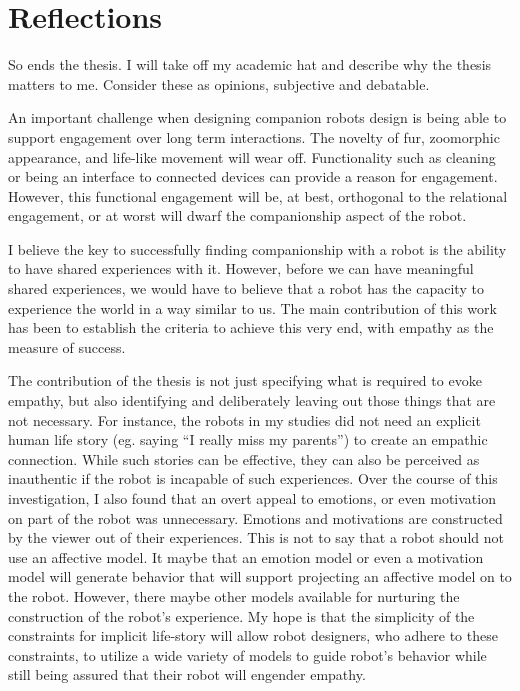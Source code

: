 \section{Reflections}

So ends the thesis. I will take off my academic hat and describe why the thesis matters to me. Consider these as opinions, subjective and debatable.

An important challenge when designing companion robots design is being able to support engagement over long term interactions. The novelty of fur, zoomorphic appearance, and life-like movement will wear off.  Functionality such as cleaning or being an interface to connected devices can provide a reason for engagement. However, this functional engagement will be, at best, orthogonal to the relational engagement, or at worst will dwarf the companionship aspect of the robot.

I believe the key to successfully finding companionship with a robot is the ability to have shared experiences with it. However, before we can have meaningful shared experiences, we would have to believe that a robot has the capacity to experience the world in a way similar to us. The main contribution of this work has been to establish the criteria to achieve this very end, with empathy as the measure of success.

 The contribution of the thesis is not just specifying what is required to evoke empathy, but also identifying and deliberately leaving out those things that are not necessary. For instance, the robots in my studies did not need an explicit human life story (eg. saying ``I really miss my parents'') to create an empathic connection. While such stories can be effective, they can also be perceived as inauthentic if the robot is incapable of such experiences. Over the course of this investigation, I also found that an overt appeal to emotions, or even motivation on part of the robot was unnecessary. Emotions and motivations are constructed by the viewer out of their experiences. This is not to say that a robot should not use an affective model. It maybe that an emotion model or even a motivation model will generate behavior that will support projecting an affective model on to the robot. However, there maybe other models available for nurturing the construction of the robot's experience. My hope is that the simplicity of the constraints for implicit life-story will allow robot designers, who adhere to these constraints, to utilize a wide variety of models to guide robot's behavior while still being assured that their robot will engender empathy. 

